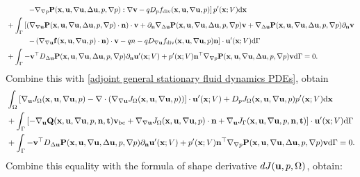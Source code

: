 \documentclass[oneside]{book}
\numberwithin{equation}{section}
\begin{document}
\begin{enumerate}[leftmargin=0in]
\begin{align*}
        &\hspace{1cm}\left.-\nabla_{\nabla p}{\bf P}({\bf x},{\bf u},\nabla{\bf u},\Delta{\bf u},p,\nabla p):\nabla{\bf v} - qD_pf_{\rm div}({\bf x},{\bf u},\nabla{\bf u},p)\right]p'({\bf x};V){\rm d}{\bf x}\\
        &+ \int_\Gamma \left[\left(\nabla_{\nabla{\bf u}}{\bf P}({\bf x},{\bf u},\nabla{\bf u},\Delta{\bf u},p,\nabla p)\cdot{\bf n}\right)\cdot{\bf v} + \partial_{\bf n}\nabla_{\Delta{\bf u}}{\bf P}({\bf x},{\bf u},\nabla{\bf u},\Delta{\bf u},p,\nabla p){\bf v} + \nabla_{\Delta{\bf u}}{\bf P}({\bf x},{\bf u},\nabla{\bf u},\Delta{\bf u},p,\nabla p)\partial_{\bf n}{\bf v}\right.\\
        &\hspace{1cm}\left.- \left(\nabla_{\nabla{\bf u}}{\bf f}({\bf x},{\bf u},\nabla{\bf u},p)\cdot{\bf n}\right)\cdot{\bf v} - qn - qD_{\nabla{\bf u}}f_{\rm div}({\bf x},{\bf u},\nabla{\bf u},p){\bf n}\right]\cdot{\bf u}'({\bf x};V){\rm d}\Gamma\\
        &+ \int_\Gamma -{\bf v}^\top D_{\Delta{\bf u}}{\bf P}({\bf x},{\bf u},\nabla{\bf u},\Delta{\bf u},p,\nabla p)\partial_{\bf n}{\bf u}'({\bf x};V) + p'({\bf x};V){\bf n}^\top\nabla_{\nabla p}{\bf P}({\bf x},{\bf u},\nabla{\bf u},\Delta{\bf u},p,\nabla p){\bf v}{\rm d}\Gamma = 0.
    \end{align*}
    Combine this with \eqref{adjoint general stationary fluid dynamics PDEs}, obtain
    \begin{align*}
        &\int_\Omega \left[\nabla_{\bf u}J_\Omega({\bf x},{\bf u},\nabla{\bf u},p) - \nabla\cdot\left(\nabla_{\nabla{\bf u}}J_\Omega({\bf x},{\bf u},\nabla{\bf u},p)\right)\right]\cdot{\bf u}'({\bf x};V) + D_pJ_\Omega({\bf x},{\bf u},\nabla{\bf u},p)p'({\bf x};V){\rm d}{\bf x}\\
        &+ \int_\Gamma \left[-\nabla_{\bf u}{\bf Q}({\bf x},{\bf u},\nabla{\bf u},p,{\bf n},{\bf t}){\bf v}_{\rm bc} + \nabla_{\nabla{\bf u}}J_\Omega({\bf x},{\bf u},\nabla{\bf u},p)\cdot{\bf n} + \nabla_{\bf u}J_\Gamma({\bf x},{\bf u},\nabla{\bf u},p,{\bf n},{\bf t})\right]\cdot{\bf u}'({\bf x};V){\rm d}\Gamma\\
        &+ \int_\Gamma -{\bf v}^\top D_{\Delta{\bf u}}{\bf P}({\bf x},{\bf u},\nabla{\bf u},\Delta{\bf u},p,\nabla p)\partial_{\bf n}{\bf u}'({\bf x};V) + p'({\bf x};V){\bf n}^\top\nabla_{\nabla p}{\bf P}({\bf x},{\bf u},\nabla{\bf u},\Delta{\bf u},p,\nabla p){\bf v}{\rm d}\Gamma = 0.
    \end{align*}
    Combine this equality with the formula of shape derivative $dJ({\bf u},p,\Omega)$, obtain:

\end{enumerate}
\end{document}
